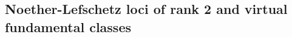 \documentclass[11pt]{amsart}
\newtheorem{thm}{Theorem}
\theoremstyle{definition}
\newcommand{\A}{\mathcal{A}}
\renewcommand{\H}{\mathsf{H}}
\DeclareMathOperator{\ct}{ct}
\begin{document}
{


\subsection{Noether-Lefschetz loci of rank 2 and virtual fundamental classes}

}
\end{document}
